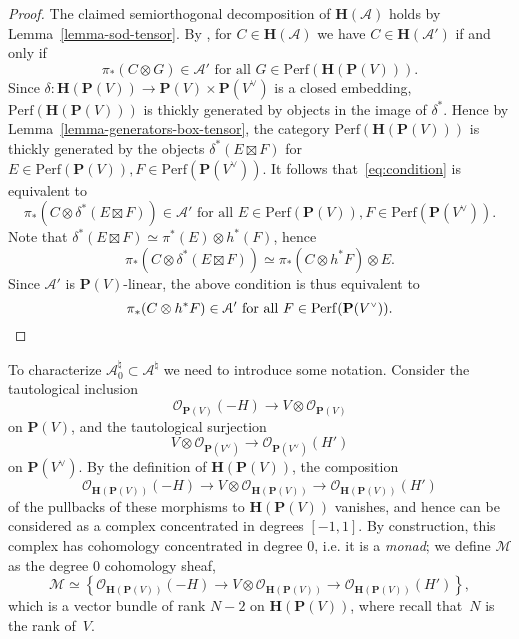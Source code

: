 \documentclass[11pt, reqno]{amsart}
\numberwithin{equation}{section}
\theoremstyle{plain}
\theoremstyle{definition}
\newcommand{\Perf}{\mathrm{Perf}}
\newcommand{\hpd}{{\natural}}
\newcommand{\svee}{\scriptscriptstyle\vee}
\newcommand{\cAd}{\cA^\hpd}
\newcommand{\stimes}{\times}
\newcommand{\vV}{V^{\svee}}
\newcommand{\cO}{\mathcal{O}}
\newcommand{\cA}{\mathcal{A}}
\newcommand{\cM}{\mathcal{M}}
\newcommand{\bH}{\mathbf{H}}
\newcommand{\bP}{\mathbf{P}}
\begin{document}
\begin{proof}
The claimed semiorthogonal decomposition of $\bH(\cA)$ 
holds by Lemma~\ref{lemma-sod-tensor}. 
By \cite[Lemma 3.18]{NCHPD}, for $C \in \bH(\cA)$ we have 
$C \in \bH(\cA')$ if and only if 
\begin{equation}
\label{eq:condition}
\pi_*(C \otimes G) \in \cA' \text{ for all } G \in \Perf(\bH(\bP(V))). 
\end{equation} 
Since $\delta \colon \bH(\bP(V)) \to \bP(V) \stimes \bP(\vV)$ is a closed 
embedding, $\Perf(\bH(\bP(V)))$ is thickly generated by objects in the image 
of $\delta^*$. 
Hence by Lemma~\ref{lemma-generators-box-tensor}, the category $\Perf(\bH(\bP(V)))$ is thickly generated 
by the objects $\delta^*(E \boxtimes F)$ 
for $E \in \Perf(\bP(V)), F \in \Perf(\bP(\vV))$. 
It follows that~\eqref{eq:condition} is equivalent to 
\begin{equation*}
\pi_*(C \otimes  \delta^*(E \boxtimes F)) \in \cA' \text{ for all } 
E \in \Perf(\bP(V)), F \in \Perf(\bP(\vV)). 
\end{equation*}
Note that $\delta^*(E \boxtimes F) \simeq \pi^*(E) \otimes h^*(F)$, hence 
\begin{equation*}
\pi_*(C \otimes  \delta^*(E \boxtimes F)) \simeq \pi_*(C \otimes h^*F) \otimes E. 
\end{equation*}
Since $\cA'$ is $\bP(V)$-linear, the above condition is thus equivalent to 
\begin{equation*}
\pi_*(C \otimes h^*F) \in \cA' \text{ for all } F \in \Perf(\bP(\vV)). \qedhere
\end{equation*}
\end{proof}

To characterize $\cAd_0 \subset \cAd$ we need to introduce some notation. 
Consider the tautological inclusion 
\begin{equation*}
\cO_{\bP(V)}(-H) \to V \otimes \cO_{\bP(V)}
\end{equation*}
on $\bP(V)$, 
and the tautological surjection 
\begin{equation*}
V \otimes \cO_{\bP(\vV)} \to \cO_{\bP(\vV)}(H')
\end{equation*}
on $\bP(\vV)$. 
By the definition of $\bH(\bP(V))$, the composition 
\begin{equation*}
\cO_{\bH(\bP(V))}(-H) \to V \otimes \cO_{\bH(\bP(V))} \to \cO_{\bH(\bP(V))}(H') 
\end{equation*} 
of the pullbacks of these morphisms to $\bH(\bP(V))$ vanishes, and hence can 
be considered as a complex concentrated in degrees $[-1,1]$. 
By construction, this complex has cohomology concentrated in degree $0$, 
i.e. it is a \emph{monad};  
we define $\cM$ as the degree $0$ cohomology sheaf, 
\begin{equation*}
\cM \simeq \left\{ \cO_{\bH(\bP(V))}(-H) \to V \otimes \cO_{\bH(\bP(V))} \to \cO_{\bH(\bP(V))}(H') \right\},
\end{equation*}
which is a vector bundle of rank $N-2$ on $\bH(\bP(V))$,
where recall that~$N$ is the rank of~$V$.
\end{document}
